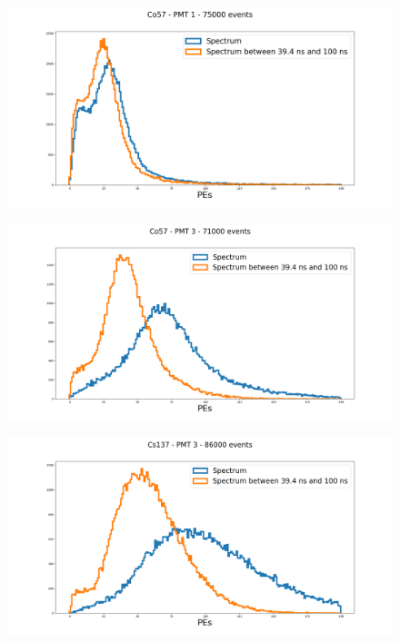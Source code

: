 \documentclass{beamer}
\begin{document}
\begin{frame}
\begin{figure}[h]
\includegraphics[width=1\linewidth]{SpecCo1.png}
\end{figure}
\end{frame}

\begin{frame}
\begin{figure}[h]
\includegraphics[width=1\linewidth]{SpecCo3.png}
\end{figure}
\end{frame}

\begin{frame}
\begin{figure}[h]
\includegraphics[width=1\linewidth]{SpecCs3.png}
\end{figure}
\end{frame}
\end{document}
